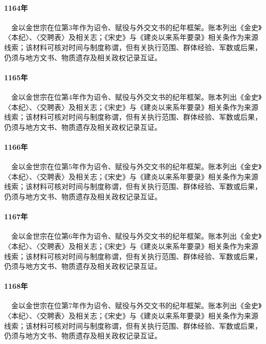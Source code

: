 \paragraph{1164年}　金以金世宗在位第3年作为诏令、赋役与外交文书的纪年框架。账本列出《金史》〈本纪〉、〈交聘表〉及相关志；《宋史》与《建炎以来系年要录》相关条作为来源线索；该材料可核对时间与制度称谓，但有关执行范围、群体经验、军数或后果，仍须与地方文书、物质遗存及相关政权记录互证。

\paragraph{1165年}　金以金世宗在位第4年作为诏令、赋役与外交文书的纪年框架。账本列出《金史》〈本纪〉、〈交聘表〉及相关志；《宋史》与《建炎以来系年要录》相关条作为来源线索；该材料可核对时间与制度称谓，但有关执行范围、群体经验、军数或后果，仍须与地方文书、物质遗存及相关政权记录互证。

\paragraph{1166年}　金以金世宗在位第5年作为诏令、赋役与外交文书的纪年框架。账本列出《金史》〈本纪〉、〈交聘表〉及相关志；《宋史》与《建炎以来系年要录》相关条作为来源线索；该材料可核对时间与制度称谓，但有关执行范围、群体经验、军数或后果，仍须与地方文书、物质遗存及相关政权记录互证。

\paragraph{1167年}　金以金世宗在位第6年作为诏令、赋役与外交文书的纪年框架。账本列出《金史》〈本纪〉、〈交聘表〉及相关志；《宋史》与《建炎以来系年要录》相关条作为来源线索；该材料可核对时间与制度称谓，但有关执行范围、群体经验、军数或后果，仍须与地方文书、物质遗存及相关政权记录互证。

\paragraph{1168年}　金以金世宗在位第7年作为诏令、赋役与外交文书的纪年框架。账本列出《金史》〈本纪〉、〈交聘表〉及相关志；《宋史》与《建炎以来系年要录》相关条作为来源线索；该材料可核对时间与制度称谓，但有关执行范围、群体经验、军数或后果，仍须与地方文书、物质遗存及相关政权记录互证。

